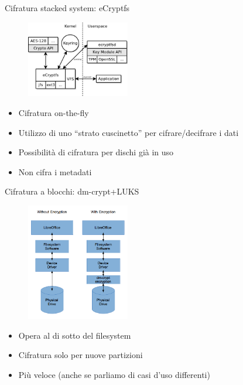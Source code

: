 
\begin{frame}{Cifratura stacked system: eCryptfs}
    \begin{figure}[h]
        \includegraphics[width=0.4\textwidth]{images/ecryptfs.jpg}
    \end{figure}
\begin{itemize}
    \item Cifratura on-the-fly
    \item Utilizzo di uno ``strato cuscinetto'' per cifrare/decifrare i dati
    \item Possibilità di cifratura per dischi già in uso
    \item Non cifra i metadati
\end{itemize}
\end{frame}


\begin{frame}{Cifratura a blocchi: dm-crypt+LUKS}
    \begin{figure}[h]
        \includegraphics[width=0.4\textwidth]{images/dm-crypt.png}
    \end{figure}
\begin{itemize}
    \item Opera al di sotto del filesystem
    \item Cifratura solo per nuove partizioni
    \item Più veloce (anche se parliamo di casi d'uso differenti)
\end{itemize}
\end{frame}

